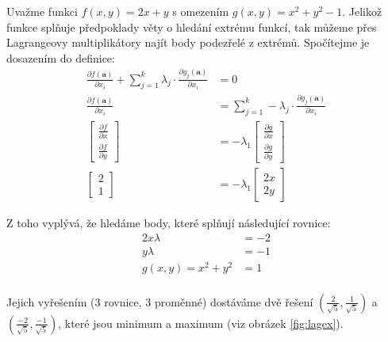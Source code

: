 \documentclass[../main.tex]{subfiles}
\begin{document}
\begin{intuition}
	Uvažme funkci \(f(x, y) = 2x + y\) s omezením \(g(x, y) = x^2 + y^2 - 1\).
	Jelikož funkce splňuje předpoklady věty o hledání extrému funkcí, tak můžeme přes Lagrangeovy multiplikátory najít body podezřelé z extrémů.
	Spočítejme je dosazením do definice:
	\[\begin{aligned}
		\frac{\partial f(\mathbf{a})}{\partial x_i} + \sum_{j=1}^{k}\lambda_j \cdot \frac{\partial g_j(\mathbf{a})}{\partial x_i} &= 0 \\
		\frac{\partial f(\mathbf{a})}{\partial x_i} &= \sum_{j=1}^{k}-\lambda_j \cdot \frac{\partial g_j(\mathbf{a})}{\partial x_i} \\
		\begin{bmatrix} \frac{\partial f}{\partial x} \\[6pt] \frac{\partial f}{\partial y} \end{bmatrix} &= -\lambda_1 \begin{bmatrix} \frac{\partial g}{\partial x} \\[6pt]  \frac{\partial g}{\partial y} \end{bmatrix} \\
			\begin{bmatrix} 2 \\ 1 \end{bmatrix} &= -\lambda_1 \begin{bmatrix} 2x \\ 2y \end{bmatrix}
	\end{aligned}\]

	Z toho vyplývá, že hledáme body, které splňují následující rovnice:
	\[\begin{aligned}
		2x \lambda &= -2 \\
		y \lambda &= -1 \\
		g(x, y) = x^2 + y^2 &= 1 \\
	\end{aligned}\]

	Jejich vyřešením (3 rovnice, 3 proměnné) dostáváme dvě řešení \(\left(\frac{2}{\sqrt{5}}, \frac{1}{\sqrt{5}}\right)\) a \(\left(\frac{-2}{\sqrt{5}}, \frac{-1}{\sqrt{5}}\right)\), které jsou minimum a maximum (viz obrázek \ref{fig:lagex}).
		


\end{intuition}
\end{document}
